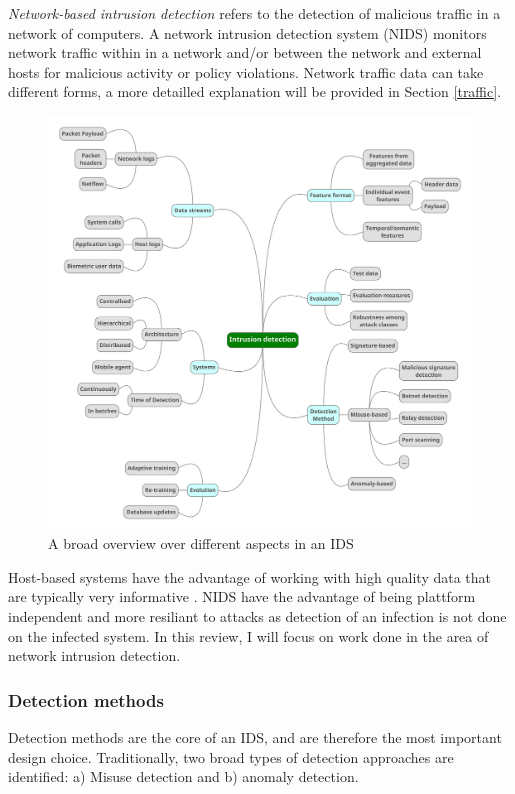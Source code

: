 \textit{Network-based intrusion detection} refers to the detection of malicious traffic in a network of computers. A network intrusion detection system (NIDS) monitors network traffic within in a network and/or between the network and external hosts for malicious activity or policy violations. Network traffic data can take different forms, a more detailled explanation will be provided in Section \ref{traffic}.

\begin{figure}\label{graph}
\centering
\includegraphics[scale=0.25]{images/Graphic2.pdf}
\caption{A broad overview over different aspects in an IDS}
\end{figure}

Host-based systems have the advantage of working with high quality data that   are   typically   very   informative \cite{lazarevic2005intrusion}. NIDS have the advantage of being plattform independent and more resiliant to attacks as detection of an infection is not done on the infected system. In this review, I will focus on work done in the area of network intrusion detection.


\subsubsection*{Detection methods}

Detection methods are the core of an IDS, and are therefore the most important design choice. Traditionally, two broad types of detection approaches are identified: a) Misuse detection and b) anomaly detection. 

